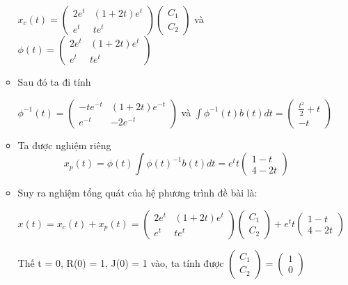 \documentclass[a4paper]{article}
\begin{document}
\begin{enumerate}
\begin{itemize}
        \begin{center}
            $x_c(t) = \left( \begin{matrix} 2e^{t} & (1+2t)e^{t} \\ e^{t} & te^{t} \end{matrix} \right) \left( \begin{matrix} C_1 \\ C_2 \end{matrix} \right)$ và $\phi(t) = \left( \begin{matrix} 2e^{t} & (1+2t)e^{t} \\ e^{t} & te^{t} \end{matrix} \right)$
        \end{center}
    \item Sau đó ta đi tính
        \begin{center}
            $\phi^{-1}(t) = \left( \begin{matrix} -te^{-t} & (1+2t)e^{-t} \\ e^{-t} & -2e^{-t} \end{matrix} \right)$ và $\int\phi^{-1}(t)b(t)dt = \left( \begin{matrix} \frac{t^2}{2} + t \\ -t \end{matrix} \right)$
        \end{center}
    \item Ta được nghiệm riêng $$x_p(t) = \phi(t)\int\phi(t)^{-1}b(t)dt = e^{t}t \left( \begin{matrix} 1-t \\ 4-2t \end{matrix} \right)$$
    \item Suy ra nghiệm tổng quát của hệ phương trình đề bài là:
        \begin{center}
                $x(t) = x_c(t) + x_p(t) = \left( \begin{matrix} 2e^{t} & (1+2t)e^{t} \\ e^{t} & te^{t} \end{matrix} \right) \left( \begin{matrix} C_1 \\ C_2 \end{matrix} \right) + e^{t}t \left( \begin{matrix} 1-t\\ 4-2t \end{matrix} \right)$
        \end{center}
        Thế t = 0, R(0) = 1, J(0) = 1 vào, ta tính được $\left( \begin{matrix} C_1 \\ C_2 \end{matrix} \right) = \left( \begin{matrix} 1 \\ 0 \end{matrix} \right)$ 

\end{itemize}
\end{enumerate}
\end{document}
